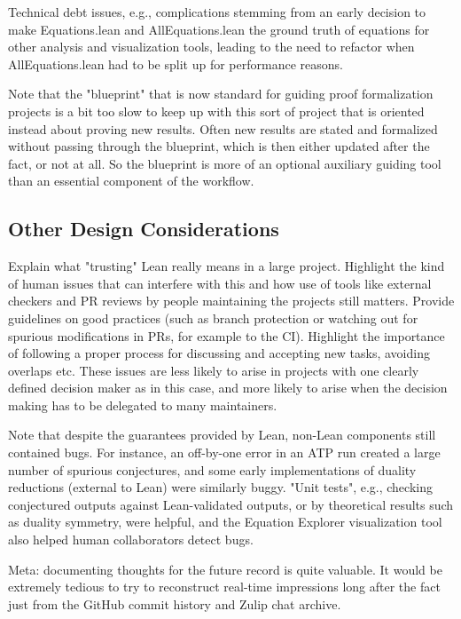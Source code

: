 Technical debt issues, e.g., complications stemming from an early decision to make Equations.lean and AllEquations.lean the ground truth of equations for other analysis and visualization tools, leading to the need to refactor when AllEquations.lean had to be split up for performance reasons.

Note that the "blueprint" that is now standard for guiding proof formalization projects is a bit too slow to keep up with this sort of project that is oriented instead about proving new results. Often new results are stated and formalized without passing through the blueprint, which is then either updated after the fact, or not at all. So the blueprint is more of an optional auxiliary guiding tool than an essential component of the workflow.

\subsection{Other Design Considerations}

Explain what "trusting" Lean really means in a large project. Highlight the kind of human issues that can interfere with this and how use of tools like external checkers and PR reviews by people maintaining the projects still matters. Provide guidelines on good practices (such as branch protection or watching out for spurious modifications in PRs, for example to the CI). Highlight the importance of following a proper process for discussing and accepting new tasks, avoiding overlaps etc. These issues are less likely to arise in projects with one clearly defined decision maker as in this case, and more likely to arise when the decision making has to be delegated to many maintainers.

Note that despite the guarantees provided by Lean, non-Lean components still contained bugs. For instance, an off-by-one error in an ATP run created a large number of spurious conjectures, and some early implementations of duality reductions (external to Lean) were similarly buggy. "Unit tests", e.g., checking conjectured outputs against Lean-validated outputs, or by theoretical results such as duality symmetry, were helpful, and the Equation Explorer visualization tool also helped human collaborators detect bugs.

Meta: documenting thoughts for the future record is quite valuable. It would be extremely tedious to try to reconstruct real-time impressions long after the fact just from the GitHub commit history and Zulip chat archive.

